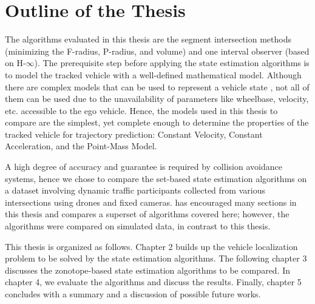 \section{Outline of the Thesis}
The algorithms evaluated in this thesis are the segment intersection methods (minimizing the F-radius, P-radius, and volume) and one interval observer (based on H-$\infty$). The prerequisite step before applying the state estimation algorithms is to model the tracked vehicle with a well-defined mathematical model. Although there are complex models that can be used to represent a vehicle state \cite{Althoff}, not all of them can be used due to the unavailability of parameters like wheelbase, velocity, etc. accessible to the ego vehicle. Hence, the models used in this thesis to compare are the simplest, yet complete enough to determine the properties of the tracked vehicle for trajectory prediction: Constant Velocity, Constant Acceleration, and the Point-Mass Model.

A high degree of accuracy and guarantee is required by collision avoidance systems, hence we chose to compare the set-based state estimation algorithms on a dataset involving dynamic traffic participants collected from various intersections using drones and fixed cameras. \cite{Rath} has encouraged many sections in this thesis and compares a superset of algorithms covered here; however, the algorithms were compared on simulated data, in contrast to this thesis.

This thesis is organized as follows. Chapter 2 builds up the vehicle localization problem to be solved by the state estimation algorithms. The following chapter 3 discusses the zonotope-based state estimation algorithms to be compared. In chapter 4, we evaluate the algorithms and discuss the results. Finally, chapter 5 concludes with a summary and a discussion of possible future works.




